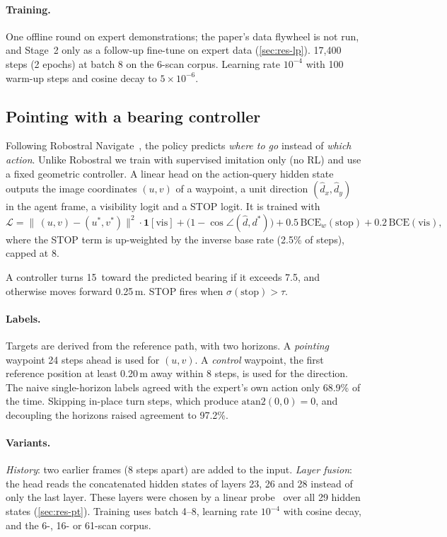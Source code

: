 \documentclass[11pt]{article}
\begin{document}
\paragraph{Training.}
One offline round on expert demonstrations; the paper's data flywheel is not run, and Stage~2 only as a
follow-up fine-tune on expert data (\cref{sec:res-lp}). 17,400 steps (2 epochs)
at batch 8 on the 6-scan corpus. Learning rate $10^{-4}$ with 100 warm-up steps and cosine
decay to $5\times10^{-6}$.

\subsection{Pointing with a bearing controller}
\label{sec:m-pt}
Following Robostral Navigate~\citep{robostral}, the policy predicts \emph{where to go} instead of \emph{which action}.
Unlike Robostral we train with supervised imitation only (no RL) and use a fixed geometric controller.
A linear head on the action-query hidden state outputs the image coordinates $(u,v)$ of a waypoint, a unit direction
$(\hat d_x,\hat d_y)$ in the agent frame, a visibility logit and a STOP logit. It is trained with
\begin{equation}
\mathcal{L} = \|\,(u,v)-(u^*,v^*)\|^2 \cdot \mathbf{1}[\text{vis}]
  + \big(1-\cos\angle(\hat d, d^*)\big) + 0.5\,\mathrm{BCE}_{w}(\text{stop}) + 0.2\,\mathrm{BCE}(\text{vis}),
\end{equation}
where the STOP term is up-weighted by the inverse base rate (2.5\% of steps), capped at 8.

A controller turns 15\textdegree\ toward the predicted bearing if it exceeds 7.5\textdegree, and otherwise moves
forward 0.25\,m. STOP fires when $\sigma(\text{stop})>\tau$.

\paragraph{Labels.}
Targets are derived from the reference path, with two horizons. A \emph{pointing} waypoint 24 steps ahead is used for
$(u,v)$. A \emph{control} waypoint, the first reference position at least 0.20\,m away within 8 steps, is used for the
direction. The naive single-horizon labels agreed with the expert's own action only 68.9\% of the time. Skipping
in-place turn steps, which produce $\mathrm{atan2}(0,0){=}0$, and decoupling the horizons raised agreement to 97.2\%.

\paragraph{Variants.}
\emph{History}: two earlier frames (8 steps apart) are added to the input. \emph{Layer fusion}: the head reads the
concatenated hidden states of layers 23, 26 and 28 instead of only the last layer. These layers were chosen by a linear
probe~\citep{alain2016probes} over all 29 hidden states (\cref{sec:res-pt}). Training uses batch 4--8, learning rate
$10^{-4}$ with cosine decay, and the 6-, 16- or 61-scan corpus.
\end{document}

